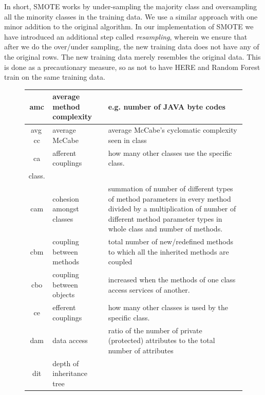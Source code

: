 \documentclass[conference]{IEEEtran}
\begin{document}
{In short, SMOTE works by under-sampling the majority class and oversampling all the minority classes in the training data. We use a similar approach with one minor addition to the original algorithm. In our implementation of SMOTE we have introduced an additional step called \textit{resampling}, wherein we ensure that after we do the over/under sampling, the new training data does not have any of the original rows. The new training data merely resembles the original data. This is done as a precautionary measure, so as not to have HERE and Random Forest train on the same training data. 

\begin{figure}[htbp!]
  \renewcommand{\baselinestretch}{0.8}\begin{center}
    {\scriptsize
      \begin{tabular}{c|l|p{4.7in}}
        amc & average method complexity & e.g. number of JAVA byte codes\\\hline
        avg\, cc & average McCabe & average McCabe's cyclomatic complexity seen
        in class\\\hline
        ca & afferent couplings & how many other classes use the specific
        class. \\\hline
class. \\\hline
        cam & cohesion amongst classes & summation of number of different
        types of method parameters in every method divided by a multiplication
        of number of different method parameter types in whole class and
        number of methods. \\\hline
        cbm &coupling between methods &  total number of new/redefined methods
        to which all the inherited methods are coupled\\\hline
        cbo & coupling between objects & increased when the methods of one
        class access services of another.\\\hline
        ce & efferent couplings & how many other classes is used by the
        specific class. \\\hline
        dam & data access & ratio of the number of private (protected)
        attributes to the total number of attributes\\\hline
        dit & depth of inheritance tree &\\\hline

\end{tabular}}
\end{center}
\end{figure}}
\end{document}
